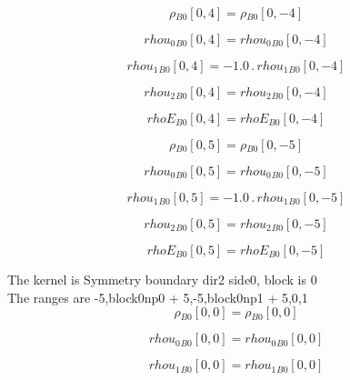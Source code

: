 \documentclass{article}
\begin{document}
\begin{dmath}{\rho{_{B0}}}[{0,4}] = {\rho{_{B0}}}[{0,-4}]\end{dmath}

\begin{dmath}{rhou_{0}{_{B0}}}[{0,4}] = {rhou_{0}{_{B0}}}[{0,-4}]\end{dmath}

\begin{dmath}{rhou_{1}{_{B0}}}[{0,4}] = - 1.0 \,.\, {rhou_{1}{_{B0}}}[{0,-4}]\end{dmath}

\begin{dmath}{rhou_{2}{_{B0}}}[{0,4}] = {rhou_{2}{_{B0}}}[{0,-4}]\end{dmath}

\begin{dmath}{rhoE{_{B0}}}[{0,4}] = {rhoE{_{B0}}}[{0,-4}]\end{dmath}

\begin{dmath}{\rho{_{B0}}}[{0,5}] = {\rho{_{B0}}}[{0,-5}]\end{dmath}

\begin{dmath}{rhou_{0}{_{B0}}}[{0,5}] = {rhou_{0}{_{B0}}}[{0,-5}]\end{dmath}

\begin{dmath}{rhou_{1}{_{B0}}}[{0,5}] = - 1.0 \,.\, {rhou_{1}{_{B0}}}[{0,-5}]\end{dmath}

\begin{dmath}{rhou_{2}{_{B0}}}[{0,5}] = {rhou_{2}{_{B0}}}[{0,-5}]\end{dmath}

\begin{dmath}{rhoE{_{B0}}}[{0,5}] = {rhoE{_{B0}}}[{0,-5}]\end{dmath}

\noindent The kernel is Symmetry boundary dir2 side0, block is 0\\\noindent The ranges are -5,block0np0 + 5,-5,block0np1 + 5,0,1\\\begin{dmath}{\rho{_{B0}}}[{0,0}] = {\rho{_{B0}}}[{0,0}]\end{dmath}

\begin{dmath}{rhou_{0}{_{B0}}}[{0,0}] = {rhou_{0}{_{B0}}}[{0,0}]\end{dmath}

\begin{dmath}{rhou_{1}{_{B0}}}[{0,0}] = {rhou_{1}{_{B0}}}[{0,0}]\end{dmath}
\end{document}
